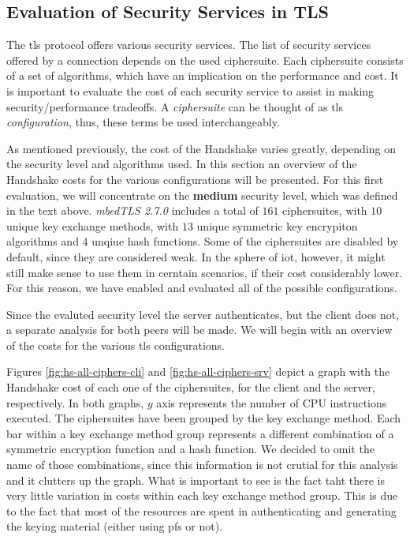 \documentclass{llncs}
\begin{document}
\subsection{Evaluation of Security Services in TLS} \label{sec:ss-overview}

The \gls{tls} protocol offers various security services. The list of security services offered by a connection
depends on the used ciphersuite. Each ciphersuite consists of a set of algorithms, which have an implication 
on the performance and cost. It is important to evaluate the cost of each security service to assist in making
security/performance tradeoffs. A \textit{ciphersuite} can be thought of as \gls{tls} \textit{configuration},
thus, these terms be used interchangeably.

As mentioned previously, the cost of the Handshake varies greatly, depending on the security level and algorithms used.
In this section an overview of the Handshake costs for the various configurations will be presented. For this
first evaluation, we will concentrate on the \textbf{medium} security level, which was defined in the text above.
\textit{mbedTLS 2.7.0} includes a total of $161$ ciphersuites, with $10$ unique key exchange methods, with $13$ unique
symmetric key encrypiton algorithms and $4$ unqiue hash functions. Some of the ciphersuites are disabled by default,
since they are considered weak. In the sphere of \gls{iot}, however, it might still make sense to use them in cerntain
scenarios, if their cost considerably lower. For this reason, we have enabled and evaluated all of the possible configurations.

Since the evaluted security level the server authenticates, but the client does not,
a separate analysis for both peers will be made. We will begin with an overview of the costs for the various \gls{tls}
configurations.

Figures \ref{fig:hs-all-ciphers-cli} and \ref{fig:hs-all-ciphers-srv} depict a graph with the Handshake cost of each one 
of the ciphersuites, for the client and the server, respectively. In both graphs, $y$ axis represents the number of 
CPU instructions executed. The ciphersuites have been grouped by the key exchange method. Each bar within a key 
exchange method group represents a different combination of a symmetric encryption function and a hash function. 
We decided to omit the name of those combinations, since this information is not crutial for this analysis and it 
clutters up the graph. What is important to see is the fact taht there is very little  variation in costs within 
each key exchange method group. This is due to the fact that most of the resources are spent in authenticating and 
generating the keying material (either using \gls{pfs} or not).
\end{document}
